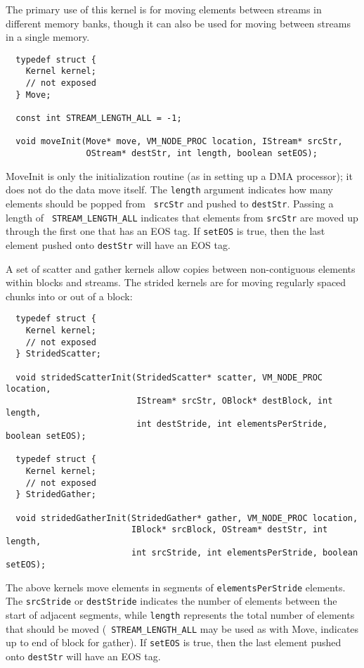  The primary use of this kernel is for moving elements
between streams in different memory banks, though it can also be used
for moving between streams in a single memory.

{\small \begin{verbatim}
  typedef struct {
    Kernel kernel;
    // not exposed
  } Move;
  
  const int STREAM_LENGTH_ALL = -1;
  
  void moveInit(Move* move, VM_NODE_PROC location, IStream* srcStr, 
                OStream* destStr, int length, boolean setEOS);
\end{verbatim}}

MoveInit is only the initialization routine (as in setting up a DMA
processor); it does not do the data move itself.  The {\tt length}
argument indicates how many elements should be popped from {\tt
srcStr} and pushed to {\tt destStr}. Passing a length of {\tt
STREAM\_LENGTH\_ALL} indicates that elements from {\tt srcStr} are
moved up through the first one that has an EOS tag.  If {\tt setEOS}
is true, then the last element pushed onto {\tt destStr} will have an
EOS tag.

 A set of scatter and gather kernels allow copies
between non-contiguous elements within blocks and streams.  The
strided kernels are for moving regularly spaced chunks into or out of
a block:
{\small \begin{verbatim}
  typedef struct {
    Kernel kernel;
    // not exposed
  } StridedScatter;
  
  void stridedScatterInit(StridedScatter* scatter, VM_NODE_PROC location, 
                          IStream* srcStr, OBlock* destBlock, int length,
                          int destStride, int elementsPerStride, boolean setEOS);

  typedef struct {
    Kernel kernel;
    // not exposed
  } StridedGather;
  
  void stridedGatherInit(StridedGather* gather, VM_NODE_PROC location, 
                         IBlock* srcBlock, OStream* destStr, int length,
                         int srcStride, int elementsPerStride, boolean setEOS);
\end{verbatim}}

The above kernels move elements in segments of {\tt elementsPerStride}
elements. The {\tt srcStride} or {\tt destStride} indicates the number
of elements between the start of adjacent segments, while {\tt length}
represents the total number of elements that should be moved ({\tt
STREAM\_LENGTH\_ALL} may be used as with Move, indicates up to end of
block for gather).  If {\tt setEOS} is true, then the last element
pushed onto {\tt destStr} will have an EOS tag.

